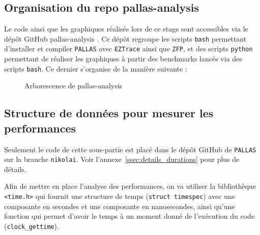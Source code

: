

\subsection{Organisation du repo pallas-analysis}\label{ssec:pallas_analysis_repo}

Le code ainsi que les graphiques réalisés lors de ce stage sont accessibles via le dépôt GitHub pallas-analysis \cite{pallas-analysis}.\newline
Ce dépôt regroupe les scripts \verb!bash! permettant d'installer et compiler \verb!PALLAS! avec \verb!EZTrace! ainsi que \verb!ZFP!, et des scripts 
\verb!python! permettant de réaliser les graphiques à partir des benchmarks lancés via des scripts \verb!bash!.
\newline
Ce dernier s'organise de la manière suivante :

\begin{figure}[!h]
\centering
\begin{minipage}{7cm}
\end{minipage}
\caption{Arborescence de pallas-analysis}
\label{fig:dirtree}
\end{figure}

\subsection{Structure de données pour mesurer les performances}\label{ssec:clock}

Seulement le code de cette sous-partie est placé dans le dépôt GitHub de \verb!PALLAS! \cite{pallas-git} sur la branche \verb!nikolai!.
Voir l'annexe~\ref{ssec:details_durations} pour plus de détails.

Afin de mettre en place l'analyse des performances, on va utiliser la bibliothèque \verb!<time.h>! qui fournit une structure de temps (\verb!struct timespec!) avec
une composante en secondes et une composante en nanosecondes, ainsi qu'une fonction qui permet d'avoir le temps à un moment donné de l'exécution du code (\verb!clock_gettime!).\\

